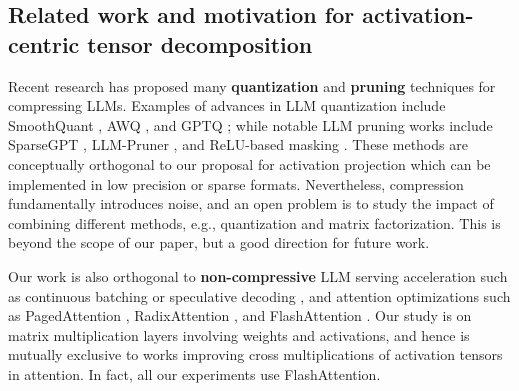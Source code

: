 \documentclass{article}
\theoremstyle{plain}
\begin{document}
\subsection{Related work and motivation for activation-centric tensor decomposition}\label{sec:related_works}
Recent research has proposed many \textbf{quantization} and \textbf{pruning} techniques for compressing LLMs. Examples of advances in LLM quantization include SmoothQuant \cite{xiao2023smoothquant}, AWQ \cite{lin2023awq}, and GPTQ \cite{frantar2022gptq}; while notable LLM pruning works include SparseGPT \cite{frantar2023sparsegpt}, LLM-Pruner \cite{ma2023llm_pruner}, and ReLU-based masking \cite{mirzadeh2023relu}. These methods are conceptually orthogonal to our proposal for activation projection which can be implemented in low precision or sparse formats. Nevertheless, compression fundamentally introduces noise, and an open problem is to study the impact of combining different methods, e.g., quantization and matrix factorization. This is beyond the scope of our paper, but a good direction for future work.


Our work is also orthogonal to \textbf{non-compressive} LLM serving acceleration such as continuous batching \cite{yu2022continuousbatching} or speculative decoding \cite{kim2024speculativedecoding}, and attention optimizations such as PagedAttention \cite{kwon2023pagedattn}, RadixAttention \cite{zheng2023radixattn}, and FlashAttention \cite{dao2022flashattention}. Our study is on matrix multiplication layers involving weights and activations, and hence is mutually exclusive to works improving cross multiplications of activation tensors in attention. In fact, all our experiments use FlashAttention.
\end{document}
